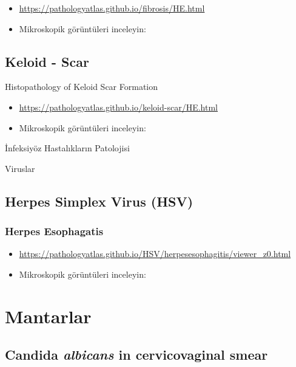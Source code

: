 \documentclass[
  letterpaper,
  DIV=11,
  numbers=noendperiod]{scrreprt}
\begin{document}
\begin{itemize}
\item
  \url{https://pathologyatlas.github.io/fibrosis/HE.html}
\item
  Mikroskopik görüntüleri inceleyin:
\end{itemize}

\hypertarget{keloid---scar}{%
\section{Keloid - Scar}\label{keloid---scar}}

Histopathology of Keloid Scar Formation

\begin{itemize}
\item
  \url{https://pathologyatlas.github.io/keloid-scar/HE.html}
\item
  Mikroskopik görüntüleri inceleyin:
\end{itemize}

İnfeksiyöz Hastalıkların Patolojisi

Viruslar

\hypertarget{herpes-simplex-virus-hsv}{%
\section{Herpes Simplex Virus (HSV)}\label{herpes-simplex-virus-hsv}}

\hypertarget{herpes-esophagatis}{%
\subsection{Herpes Esophagatis}\label{herpes-esophagatis}}

\begin{itemize}
\item
  \url{https://pathologyatlas.github.io/HSV/herpesesophagitis/viewer_z0.html}
\item
  Mikroskopik görüntüleri inceleyin:
\end{itemize}

\hypertarget{mantarlar}{%
\chapter{Mantarlar}\label{mantarlar}}

\hypertarget{candida-albicans-in-cervicovaginal-smear}{%
\section{\texorpdfstring{Candida \emph{albicans} in cervicovaginal
smear}{Candida albicans in cervicovaginal smear}}\label{candida-albicans-in-cervicovaginal-smear}}
\end{document}
